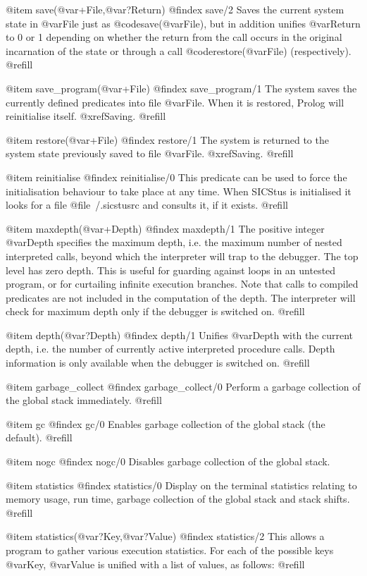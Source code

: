 @item save(@var{+File},@var{?Return})
@findex save/2
Saves the current system state in @var{File} just as
@code{save(@var{File})}, but in addition unifies @var{Return} to 0 or 1
depending on whether the return from the call occurs in the original
incarnation of the state or through a call @code{restore(@var{File})}
(respectively). @refill

@item save_program(@var{+File})
@findex save_program/1
The system saves the currently defined predicates into file @var{File}.
When it is restored, Prolog will reinitialise itself. @xref{Saving}. @refill

@item restore(@var{+File})
@findex restore/1
The system is returned to the system state previously saved to file
@var{File}. @xref{Saving}. @refill

@item reinitialise
@findex reinitialise/0
This predicate can be used to force the initialisation behaviour to take
place at any time.  When SICStus is initialised it looks for a file
@file{~/.sicstusrc} and consults it, if it exists. @refill

@item maxdepth(@var{+Depth})
@findex maxdepth/1
The positive integer @var{Depth} specifies the maximum depth, i.e. the
maximum number of nested interpreted calls, beyond which the interpreter
will trap to the debugger.  The top level has zero depth.  This is
useful for guarding against loops in an untested program, or for
curtailing infinite execution branches.  Note that calls to compiled
predicates are not included in the computation of the depth.  The
interpreter will check for maximum depth only if the debugger is
switched on. @refill

@item depth(@var{?Depth})
@findex depth/1
Unifies @var{Depth} with the current depth, i.e. the number of currently
active interpreted procedure calls.  Depth information is only available
when the debugger is switched on. @refill

@item garbage_collect
@findex garbage_collect/0
Perform a garbage collection of the global stack immediately. @refill

@item gc
@findex gc/0
Enables garbage collection of the global stack (the default). @refill

@item nogc
@findex nogc/0
Disables garbage collection of the global stack.

@item statistics
@findex statistics/0
Display on the terminal statistics relating to memory usage, run time,
garbage collection of the global stack and stack shifts. @refill

@item statistics(@var{?Key},@var{?Value})
@findex statistics/2
This allows a program to gather various execution statistics.  For each of
the possible keys @var{Key}, @var{Value} is unified with a list of values,
as follows: @refill

